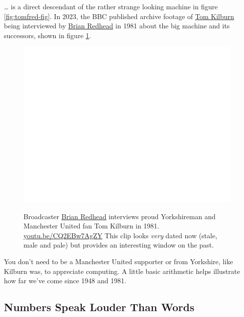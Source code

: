 \documentclass[
  12pt,
]{book}
\begin{document}
\ldots{} is a direct descendant of the rather strange looking machine in figure \ref{fig:tomfred-fig}. In 2023, the BBC published archive footage of \href{https://en.wikipedia.org/wiki/Tom_Kilburn}{Tom Kilburn} being interviewed by \href{https://en.wikipedia.org/wiki/Brian_Redhead}{Brian Redhead} in 1981 about the big machine and its successors, shown in figure \ref{fig:redhead-fig}.

\begin{figure}

{\centering \href{https://www.youtube.com/embed/CQ2EBw7AgZY}{\includegraphics[width=0.99\linewidth]{duncan-hull_files/figure-latex/redhead-fig-1} }

}

\caption{Broadcaster \href{https://en.wikipedia.org/wiki/Brian_Redhead}{Brian Redhead} interviews proud Yorkshireman and Manchester United fan Tom Kilburn in 1981. \href{https://youtu.be/CQ2EBw7AgZY}{youtu.be/CQ2EBw7AgZY} \citep{youtube-redhead} This clip looks \emph{very} dated now (stale, male and pale) but provides an interesting window on the past.}\label{fig:redhead-fig}
\end{figure}



You don't need to be a Manchester United supporter or from Yorkshire, like Kilburn was, to appreciate computing. A little basic arithmetic helps illustrate how far we've come since 1948 and 1981.

\hypertarget{louder}{%
\subsection{Numbers Speak Louder Than Words}\label{louder}}
\end{document}
